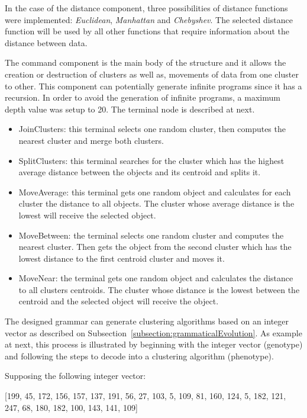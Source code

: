 \documentclass[conference,compsoc]{IEEEtran}
\begin{document}
In the case of the distance component, three possibilities of distance functions were implemented: \textit{Euclidean}, \textit{Manhattan} and \textit{Chebyshev}. The selected distance function will be used by all other functions that require information about the distance between data. 



The command component is the main body of the structure and it allows the creation or destruction of clusters as well as, movements of data from one cluster to other.  This component can potentially generate infinite programs since it has a recursion. In order to avoid the generation of infinite programs, a maximum depth value was setup to 20. The  terminal node is described at next.

\begin{itemize}
	\item JoinClusters: this terminal selects one random cluster, then computes the nearest cluster and merge both clusters.
	\item SplitClusters: this terminal searches for the cluster which has the highest average distance between the objects and its centroid and splits it. 
	\item MoveAverage:  this terminal gets one random object and calculates for each cluster the distance to all objects. The cluster whose average distance is the lowest will receive the selected object.
	\item MoveBetween: the terminal selects one random cluster and computes the nearest cluster. Then gets the object from the second cluster which has the lowest distance to the first centroid cluster and moves it.
	\item MoveNear:  the terminal gets one random object and calculates the distance to all clusters centroids. The cluster whose distance is the lowest between the centroid and the selected object will receive the object.
\end{itemize}

The designed grammar can generate clustering algorithms based on an integer vector as described on Subsection~\ref{subsection:grammaticalEvolution}. As example at next, this process is illustrated by beginning with the integer vector (genotype) and following the steps to decode into a clustering algorithm (phenotype). 

Supposing the following integer vector:

[199, 45, 172, 156, 157, 137, 191, 56, 27, 103, 5, 109, 81, 160, 124, 5, 182, 121, 247, 68, 180, 182, 100, 143, 141, 109]
\end{document}
